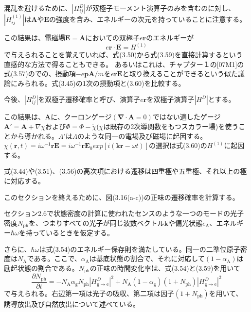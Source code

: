 \documentclass[11pt,a4j,uplatex]{jsarticle}
\begin{document}
混乱を避けるために、$\left|H_{ij}^D\right|$が双極子モーメント演算子のみを含むのに対し、$\left|H_{ij}^{(1)}\right|$は$\bm{A}$や$\bm{E}$の強度を含み、エネルギーの次元を持っていることに注意する。

この結果は、電磁場$\bm{E}=\dot{\bm{A}}$においての双極子$e\bm{r}$のエネルギーが
\begin{equation}
  e\bm{r}\cdot\bm{E}=H^{(1)}\tag{3.60}
\end{equation}
で与えられることを覚えていれば、式(3.50)から式(3.59)を直接計算するという直感的な方法で得ることもできる。
あるいはこれは、チャプター１の[07M1]の式(3.57)のでの、摂動項$-e\bm{pA}/m$を$e\bm{rE}$と取り換えることができるという似た議論にみられる。式(3.45)の1次の摂動項と(3.60)を比較する。%

今後、$\left|H_{ij}^D\right|$を双極子遷移確率と呼び、演算子$e\bm{r}$を双極子演算子$\left|H^D\right|$とする。

この結果は、$\bm{A}$に、クーロンゲージ$(\bm{\nabla\cdot A}=0)$ではない適したゲージ$\bm{A}'=\bm{A}+\nabla\chi$および$\Phi=\Phi-\dot\chi$($\chi$は既存の2次導関数をもつスカラー場)を使うことから導かれる。$A'$は$A$のような同一の電場及び磁場に起因する。$\chi(\bm{r},t)=i\omega^{-1}\bm{rE}=i\omega^{-1}\bm{r}\bm{E}_0exp[i(\bm{kr}-\omega t)]$の選択は式(3.60)の$H^{(1)}$に起因する。

式(3.44)や(3.51)、(3.56)の高次項における遷移は四重極や五重極、それ以上の極に対応する。

このセクションを終えるために、図(3.16(a-c))の正味の遷移確率を計算する。

セクション2.6で状態密度の計算に使われたセンスのような一つのモードの光子密度$N_{\mathrm{ph}}$を、つまりすべての光子が同じ波数ベクトル$\bm{k}$や偏光状態$e_{\mathrm{A}}$、エネルギー$\hbar\omega$を持っているときを仮定する。

さらに、$\hbar\omega$は式(3.54)のエネルギー保存則を満たしている。同一の二準位原子密度は$N_{\mathrm{A}}$である。ここで、$\alpha_{\mathrm{A}}$は基底状態の割合で、それに対応して$(1-\alpha_{\mathrm{A}})$は励起状態の割合である。$N_{\mathrm{ph}}$の正味の時間変化率は、式(3.54)と(3.59)を用いて
\begin{equation}
  \frac{\partial N_{\mathrm{ph}}}{\partial t}=-N_{\mathrm{A}}\alpha_{\mathrm{g}}N_{\mathrm{ph}}\left|H_{\mathrm{g\to e}}^D\right|^2+N_{\mathrm{A}}(1-\alpha_{\mathrm{g}})(1+N_{\mathrm{ph}})\left|H_{\mathrm{g\to e}}^D\right|^2\tag{3.61}
\end{equation}
で与えられる。右辺第一項は光子の吸収、第二項は因子$(1+N_{\mathrm{ph}})$を用いて、誘導放出及び自然放出について述べている。
\end{document}
